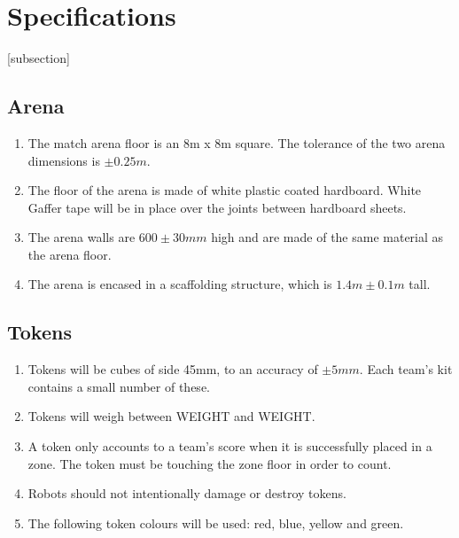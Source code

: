 \section{Specifications}
[subsection]
\newcommand{\rcnii}{\stepcounter{rulei}\arabic{section}.\arabic{subsection}.\arabic{rulei}}
\renewcommand{\labelenumi}{\rcnii}

\subsection{Arena}
\begin{enumerate}
\item The match arena floor is an 8m x 8m square.
 The tolerance of the two arena dimensions is $\pm0.25m$.
\item The floor of the arena is made of white plastic coated hardboard.
 White Gaffer tape will be in place over the joints between hardboard sheets.
\item The arena walls are $600\pm30mm$ high and are made of the same material as the arena floor.
\item The arena is encased in a scaffolding structure, which is $1.4m \pm0.1m$ tall.
\end{enumerate}

\subsection{Tokens}
\label{tokens}
\begin {enumerate} 
\item Tokens will be cubes of side 45mm, to an accuracy of $\pm5mm$.
 Each team's kit contains a small number of these.
\item Tokens will weigh between WEIGHT and WEIGHT.
\item A token only accounts to a team's score when it is successfully placed in a zone.
 The token must be touching the zone floor in order to count.
\item Robots should not intentionally damage or destroy tokens.
\item The following token colours will be used: red, blue, yellow and green.
\end {enumerate}


